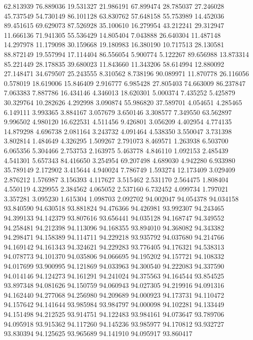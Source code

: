 62.813939
76.889036
19.531327
21.986191
67.899474
28.785037
27.246028
45.737549
54.730149
86.101128
63.830762
57.648158
55.753989
14.452036
89.451615
69.629073
87.526928
35.100610
16.279954
43.212241
29.312947
11.666136
71.941305
55.536429
14.805404
7.043888
26.640304
11.487148
14.297978
11.179098
30.159668
19.180983
16.380190
10.717513
28.130581
88.872149
19.557994
17.114404
86.556054
5.900774
5.122267
89.656988
13.873314
85.221449
28.178835
39.680023
11.843660
11.343206
58.614994
12.880092
27.148471
34.679507
25.243555
8.310562
8.738196
90.089971
11.870778
26.116056
0.578019
18.619006
15.846409
2.916777
6.985428
27.805403
74.663009
86.237847
7.063383
7.887786
16.434146
4.346013
18.620301
5.000374
7.435252
5.425879
30.329764
10.282626
4.292998
3.090874
55.986820
37.589701
4.054651
4.285465
6.149111
3.993365
3.884167
3.057679
3.650146
3.308577
7.349550
63.562897
9.996502
4.980120
16.622531
4.511456
9.426801
3.056209
4.402954
4.774135
14.879298
4.696738
2.081164
3.243732
4.091464
4.538350
3.550047
3.731398
3.802814
1.484649
4.326295
1.509267
2.791073
8.469571
1.263938
6.503700
6.065356
5.304466
2.753753
2.163975
5.463778
4.846110
1.092153
2.485439
4.541301
5.657343
84.416650
3.254954
69.207498
4.689030
4.942280
6.933980
35.789149
2.172902
3.415644
4.940024
7.786749
1.593274
12.173409
3.029409
2.876212
1.576987
3.156393
4.117627
3.515462
2.531170
2.564475
1.808404
4.550119
4.329955
2.384562
4.065052
2.537160
6.732452
4.099734
1.797021
3.357281
3.095230
1.615304
1.098703
2.092702
94.002047
94.054378
94.034158
93.840590
94.630518
93.881824
94.476366
94.426981
93.992307
94.243465
94.399133
94.142379
93.807616
93.656441
94.035128
94.168747
94.349552
94.258481
94.212398
94.113096
94.168355
93.894010
94.368082
94.343382
94.298471
94.158389
94.114711
94.229218
93.935792
94.037680
94.214766
94.169142
94.161343
94.324621
94.229283
93.776405
94.176321
94.538313
94.078773
94.101370
94.035806
94.066695
94.195202
94.157721
94.108332
94.017699
93.900995
94.121869
94.033963
94.300540
94.222083
94.337590
94.014146
94.124273
94.161291
94.241024
94.375563
94.164544
93.854525
93.897348
94.081626
94.150759
94.060943
94.027305
94.219916
94.091316
94.162440
94.277068
94.256980
94.209689
94.000923
94.173731
94.110472
94.157642
94.141644
93.985984
93.984797
94.000098
94.102281
94.133449
94.151498
94.212525
93.914751
94.122483
93.984161
94.073647
93.789706
94.095918
93.915362
94.117260
94.145236
93.985977
94.170812
93.932727
93.830394
94.125625
93.965689
94.141910
94.095917
93.860417
